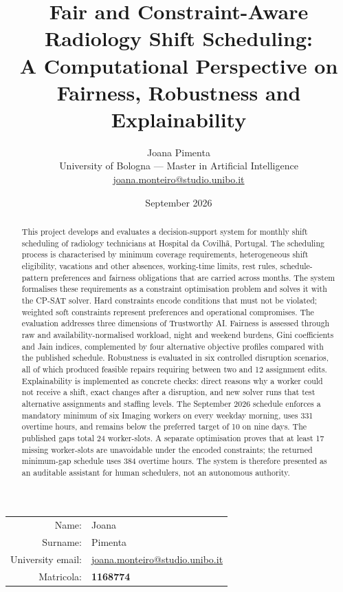 \documentclass[11pt,a4paper]{article}
\title{Fair and Constraint-Aware Radiology Shift Scheduling:\\
A Computational Perspective on Fairness, Robustness and Explainability}
\author{Joana Pimenta\\University of Bologna --- Master in Artificial Intelligence\\
\href{mailto:joana.monteiro@studio.unibo.it}{joana.monteiro@studio.unibo.it}}
\date{September 2026}
\begin{document}
\maketitle

\begin{center}
\begin{tabular}{rl}
Name: & Joana \\
Surname: & Pimenta \\
University email: & \href{mailto:joana.monteiro@studio.unibo.it}{joana.monteiro@studio.unibo.it} \\
Matricola: & \textbf{1168774}
\end{tabular}
\end{center}

\begin{abstract}
This project develops and evaluates a decision-support system for monthly shift scheduling of radiology technicians at Hospital da Covilh\~a, Portugal. The scheduling process is characterised by minimum coverage requirements, heterogeneous shift eligibility, vacations and other absences, working-time limits, rest rules, schedule-pattern preferences and fairness obligations that are carried across months. The system formalises these requirements as a constraint optimisation problem and solves it with the CP-SAT solver. Hard constraints encode conditions that must not be violated; weighted soft constraints represent preferences and operational compromises. The evaluation addresses three dimensions of Trustworthy AI. Fairness is assessed through raw and availability-normalised workload, night and weekend burdens, Gini coefficients and Jain indices, complemented by four alternative objective profiles compared with the published schedule. Robustness is evaluated in six controlled disruption scenarios, all of which produced feasible repairs requiring between two and 12 assignment edits. Explainability is implemented as concrete checks: direct reasons why a worker could not receive a shift, exact changes after a disruption, and new solver runs that test alternative assignments and staffing levels. The September 2026 schedule enforces a mandatory minimum of six Imaging workers on every weekday morning, uses 331 overtime hours, and remains below the preferred target of 10 on nine days. The published gaps total 24 worker-slots. A separate optimisation proves that at least 17 missing worker-slots are unavoidable under the encoded constraints; the returned minimum-gap schedule uses 384 overtime hours. The system is therefore presented as an auditable assistant for human schedulers, not an autonomous authority.
\end{abstract}
\end{document}
